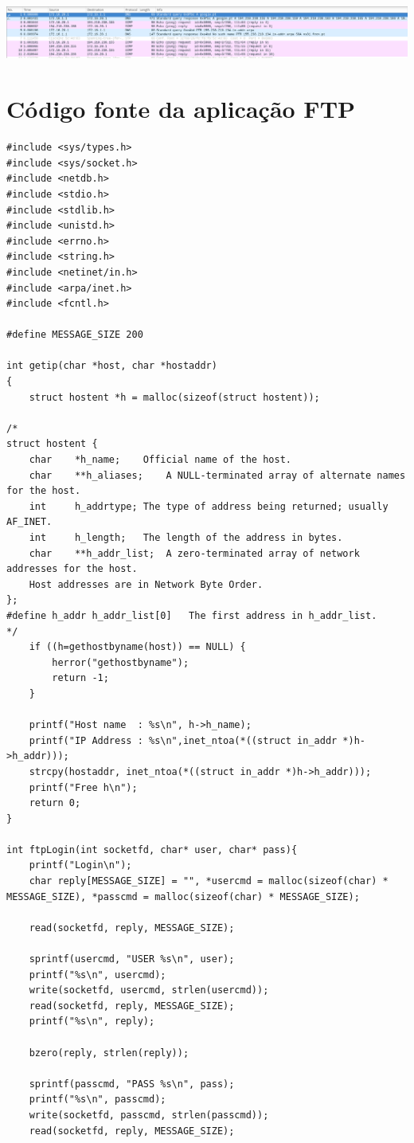 \documentclass[a4paper]{article}
\begin{document}
\includegraphics[scale=0.30]{Exp5-DNS.png}

\newpage

\section{Código fonte da aplicação FTP}
\begin{verbatim}
#include <sys/types.h>
#include <sys/socket.h>
#include <netdb.h>
#include <stdio.h>
#include <stdlib.h>
#include <unistd.h>
#include <errno.h>
#include <string.h>
#include <netinet/in.h>
#include <arpa/inet.h>
#include <fcntl.h>

#define MESSAGE_SIZE 200

int getip(char *host, char *hostaddr)
{
	struct hostent *h = malloc(sizeof(struct hostent));

/*
struct hostent {
	char    *h_name;	Official name of the host.
    char    **h_aliases;	A NULL-terminated array of alternate names for the host.
	int     h_addrtype;	The type of address being returned; usually AF_INET.
    int     h_length;	The length of the address in bytes.
	char    **h_addr_list;	A zero-terminated array of network addresses for the host.
	Host addresses are in Network Byte Order.
};
#define h_addr h_addr_list[0]	The first address in h_addr_list.
*/
    if ((h=gethostbyname(host)) == NULL) {
        herror("gethostbyname");
        return -1;
    }

    printf("Host name  : %s\n", h->h_name);
    printf("IP Address : %s\n",inet_ntoa(*((struct in_addr *)h->h_addr)));
    strcpy(hostaddr, inet_ntoa(*((struct in_addr *)h->h_addr)));
	printf("Free h\n");
    return 0;
}

int ftpLogin(int socketfd, char* user, char* pass){
  	printf("Login\n");
	char reply[MESSAGE_SIZE] = "", *usercmd = malloc(sizeof(char) * MESSAGE_SIZE), *passcmd = malloc(sizeof(char) * MESSAGE_SIZE);

	read(socketfd, reply, MESSAGE_SIZE);

	sprintf(usercmd, "USER %s\n", user);
  	printf("%s\n", usercmd);
	write(socketfd, usercmd, strlen(usercmd));
	read(socketfd, reply, MESSAGE_SIZE);
	printf("%s\n", reply);

	bzero(reply, strlen(reply));

	sprintf(passcmd, "PASS %s\n", pass);
  	printf("%s\n", passcmd);
	write(socketfd, passcmd, strlen(passcmd));
	read(socketfd, reply, MESSAGE_SIZE);


\end{verbatim}
\end{document}
